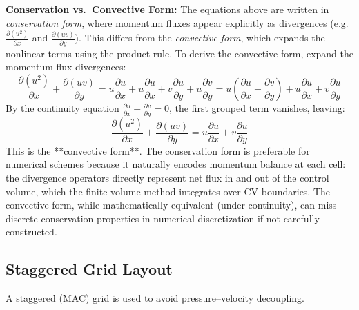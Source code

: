 \textbf{Conservation vs.\ Convective Form:}
The equations above are written in \emph{conservation form}, where momentum fluxes appear explicitly as divergences (e.g.\ $\frac{\partial(u^2)}{\partial x}$ and $\frac{\partial(uv)}{\partial y}$). This differs from the \emph{convective form}, which expands the nonlinear terms using the product rule. To derive the convective form, expand the momentum flux divergences:
\begin{equation}
    \frac{\partial(u^2)}{\partial x} + \frac{\partial(uv)}{\partial y}
    = u\frac{\partial u}{\partial x} + u\frac{\partial u}{\partial x} + v\frac{\partial u}{\partial y} + u\frac{\partial v}{\partial y}
    = u\left(\frac{\partial u}{\partial x} + \frac{\partial v}{\partial y}\right) + u\frac{\partial u}{\partial x} + v\frac{\partial u}{\partial y}
\end{equation}
By the continuity equation $\frac{\partial u}{\partial x} + \frac{\partial v}{\partial y} = 0$, the first grouped term vanishes, leaving:
\begin{equation}
    \frac{\partial(u^2)}{\partial x} + \frac{\partial(uv)}{\partial y} = u\frac{\partial u}{\partial x} + v\frac{\partial u}{\partial y}
\end{equation}
This is the **convective form**. The conservation form is preferable for numerical schemes because it naturally encodes momentum balance at each cell: the divergence operators directly represent net flux in and out of the control volume, which the finite volume method integrates over CV boundaries. The convective form, while mathematically equivalent (under continuity), can miss discrete conservation properties in numerical discretization if not carefully constructed.

\subsection{Staggered Grid Layout}

A staggered (MAC) grid is used to avoid pressure--velocity decoupling.

